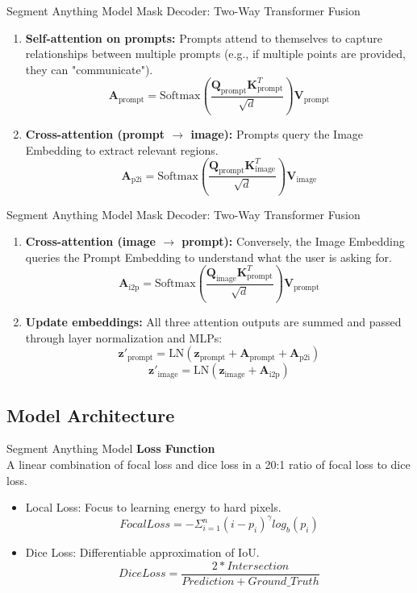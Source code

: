\documentclass[11pt, aspectratio=169]{beamer}
\begin{document}
\begin{frame}{Segment Anything Model}
	Mask Decoder: Two-Way Transformer Fusion
	
	\begin{enumerate}
		\item \textbf{Self-attention on prompts:} Prompts attend to themselves to capture relationships between multiple prompts (e.g., if multiple points are provided, they can "communicate").
		\[ \mathbf{A}_{\text{prompt}} = \text{Softmax}\left(\frac{\mathbf{Q}_{\text{prompt}} \mathbf{K}_{\text{prompt}}^T}{\sqrt{d}}\right) \mathbf{V}_{\text{prompt}} \]
		
		\item \textbf{Cross-attention (prompt $\rightarrow$ image):} Prompts query the Image Embedding to extract relevant regions.
		\[ \mathbf{A}_{\text{p2i}} = \text{Softmax}\left(\frac{\mathbf{Q}_{\text{prompt}} \mathbf{K}_{\text{image}}^T}{\sqrt{d}}\right) \mathbf{V}_{\text{image}} \]
	\end{enumerate}
\end{frame}

\begin{frame}{Segment Anything Model}
	Mask Decoder: Two-Way Transformer Fusion
	
	\begin{enumerate}
    	\item \textbf{Cross-attention (image $\rightarrow$ prompt):} Conversely, the Image Embedding queries the Prompt Embedding to understand what the user is asking for.
		\[ \mathbf{A}_{\text{i2p}} = \text{Softmax}\left(\frac{\mathbf{Q}_{\text{image}} \mathbf{K}_{\text{prompt}}^T}{\sqrt{d}}\right) \mathbf{V}_{\text{prompt}} \]

		\item \textbf{Update embeddings:} All three attention outputs are summed and passed through layer normalization and MLPs:
		\[ \mathbf{z}'_{\text{prompt}} = \text{LN}(\mathbf{z}_{\text{prompt}} + \mathbf{A}_{\text{prompt}} + \mathbf{A}_{\text{p2i}}) \]
		\[ \mathbf{z}'_{\text{image}} = \text{LN}(\mathbf{z}_{\text{image}} + \mathbf{A}_{\text{i2p}}) \]
	\end{enumerate}
\end{frame}

\subsection{Model Architecture}
\begin{frame}{Segment Anything Model}
	\textbf{Loss Function}\\
	A linear combination of focal loss and dice loss in a 20:1 ratio of focal loss to dice loss.\\
	\begin{itemize}
		\item Local Loss: Focus to learning energy to hard pixels.\\
		\[
		FocalLoss= - \Sigma_{i=1}^n (i - p_i)^\gamma log_b(p_i)
		\]
		\item Dice Loss: Differentiable approximation of IoU.
		\[
		DiceLoss=\frac{2 * Intersection}{Prediction + Ground\_Truth}
		\]
	\end{itemize}
\end{frame}
\end{document}
